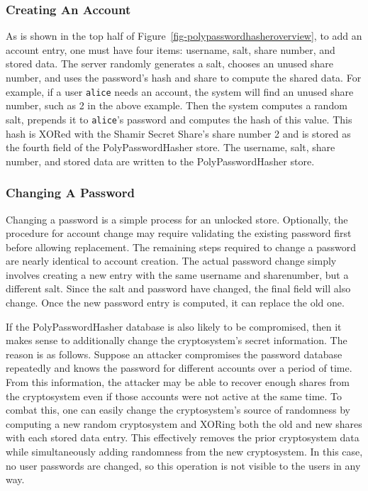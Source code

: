 \subsubsection{Creating An Account}


As is shown in the top half of Figure~\ref{fig-polypasswordhasheroverview}, 
to add an account entry, one must have four items: username, salt, share
number, and stored data.   The server
randomly generates a salt, chooses an
unused share number, and uses the password's hash and share to
compute the shared data.   For example, if a user {\tt alice} needs an
account, the system will find an unused share number, such as 2 in the
above example.   Then the system computes a random salt, prepends
it to {\tt alice}'s password and computes the hash of this value.
This hash is XORed with the Shamir Secret Share's share number 2 and is stored
as the fourth field of the PolyPasswordHasher store.   The username, salt, share
number, and stored data are written to the PolyPasswordHasher store.


\subsubsection{Changing A Password}

Changing a password is a simple process for an unlocked store.  
Optionally, the procedure for account change may require validating the 
existing password first before allowing replacement.  The remaining steps 
required to change a password are nearly identical to account creation.  
The actual password change simply 
involves creating a new entry with the same username and sharenumber, but 
a different salt.  Since the salt and password have changed, the final
field will also change.   Once the new password entry is computed, it 
can replace the old one.   

If the PolyPasswordHasher database is also likely to be compromised, then it 
makes sense to additionally change the cryptosystem's secret information.
The reason is as follows.   Suppose an attacker compromises the password 
database repeatedly and knows the password for different accounts over a 
period of time.   From this information, the attacker may be able to recover 
enough shares from the
cryptosystem even if those accounts were not active at the same time.   To
combat this, one can easily change the cryptosystem's source of randomness
by computing a new random cryptosystem and XORing both the old and new 
shares with each stored data entry.   This effectively removes the prior
cryptosystem data while simultaneously adding randomness from the new
cryptosystem.   In this case, no user passwords are changed, so this
operation is not visible to the users in any way.


